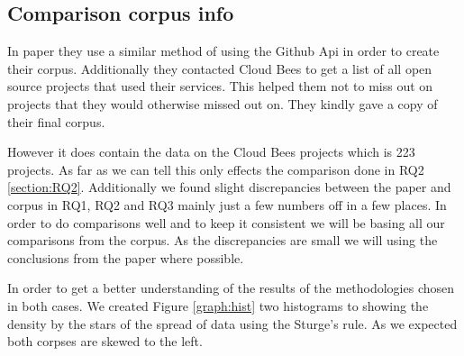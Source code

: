 \documentclass[twoside,12pt,titlepage,a4paper]{article}
\begin{document}
\vspace*{-0.05in}
\subsection{Comparison corpus info}
\label{section:HiltonComaprisonCoprusTHing}
\vspace*{-0.05in}
In \citet{Hilton2016} paper they use a similar method of using the Github Api in order to create their corpus. Additionally they contacted Cloud Bees \citet{CloudBees2020} to get a list of all open source projects that used their services. This helped them not to miss out on projects that they would otherwise missed out on. They kindly gave a copy of their final corpus. 

However it does contain the data on the Cloud Bees projects which is 223 projects. As far as we can tell this only effects the comparison done in RQ2 \ref{section:RQ2}. Additionally we found slight discrepancies between the paper and corpus in RQ1, RQ2 and RQ3 mainly just a few numbers off in a few places. In order to do comparisons well and to keep it consistent we will be basing all our comparisons from the corpus. As the discrepancies are small we will using the conclusions from the paper where possible.  

In order to get a better understanding of the results of the methodologies chosen in both cases. We created Figure \ref{graph:hist} two histograms to showing the density by the stars of the spread of data using the Sturge's rule. As we expected both corpses are skewed to the left.  
\end{document}
